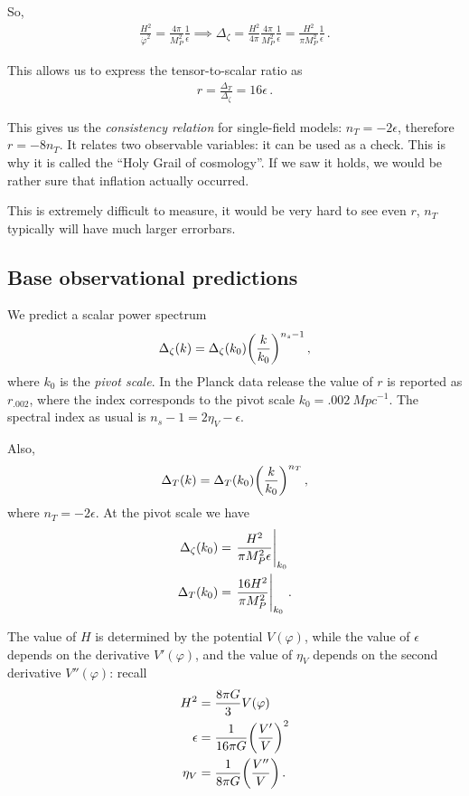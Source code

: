 \documentclass[main.tex]{subfiles}
\begin{document}
So, 
%
\begin{align}
\frac{H^2}{\dot{\varphi}^2} = \frac{4 \pi }{M_P^2} \frac{1}{\epsilon } \implies 
\Delta_\zeta = \frac{H^2}{4 \pi } \frac{4 \pi }{M_P^2} \frac{1}{\epsilon } = \frac{H^2}{\pi M_P^2 } \frac{1}{\epsilon }
\,.
\end{align}

This allows us to express the tensor-to-scalar ratio as 
%
\begin{align}
r =\frac{\Delta _T}{\Delta _\zeta } = 16 \epsilon 
\,. 
\end{align}

This gives us the \emph{consistency relation} for single-field models: \(n_T = - 2 \epsilon\), therefore \(r = - 8 n_T\). 
It relates two observable variables: it can be used as a check. 
This is why it is called the ``Holy Grail of cosmology''. If we saw it holds, we would be rather sure that inflation actually occurred. 

This is extremely difficult to measure, it would be very hard to see even \(r\), \(n_T\) typically will have much larger errorbars. 


\subsection{Base observational predictions}

We predict a scalar power spectrum 
%
\begin{align}
\Delta_{\zeta } (k) = \Delta_\zeta (k_0 ) \qty( \frac{k}{k_0 })^{n_s-1}
\,,
\end{align}
%
where \(k_0 \) is the \emph{pivot scale}. 
In the Planck data release \cite[]{planckcollaborationPlanck2018Results2019} the value of \(r\) is reported as \(r_{\num{.002}}\), where the index corresponds to the pivot scale \(k_0  = \SI{.002}{Mpc^{-1}}\).
The spectral index as usual is \(n_s - 1 = 2 \eta _V - \epsilon \). 

Also, 
%
\begin{align}
\Delta _T (k) = \Delta _T (k_0 ) \qty(\frac{k}{k_0 })^{n_T}
\,,
\end{align}
%
where \(n_T = - 2 \epsilon \). 
At the pivot scale we have 
%
\begin{align}
\Delta _\zeta (k_0 ) &= \eval{\frac{H^2}{\pi M_P^2 \epsilon }}_{k_0 }  \\
\Delta _T (k_0 ) &= \eval{\frac{16 H^2}{\pi M_P^2} }_{k_0 }
\,.
\end{align}

The value of \(H\) is determined by the potential \(V(\varphi )\), while the value of \(\epsilon \) depends on the derivative \(V' (\varphi )\), and the value of \(\eta _V\) depends on the second derivative \(V''(\varphi )\): recall 
%
\begin{align}
H^2 &= \frac{8 \pi G}{3} V(\varphi )  \\
\epsilon &= \frac{1}{16 \pi G} \qty(\frac{V'}{V})^2  \\
\eta _V &= \frac{1}{8 \pi G} \qty(\frac{V''}{V})
\,.
\end{align}
%
\end{document}
